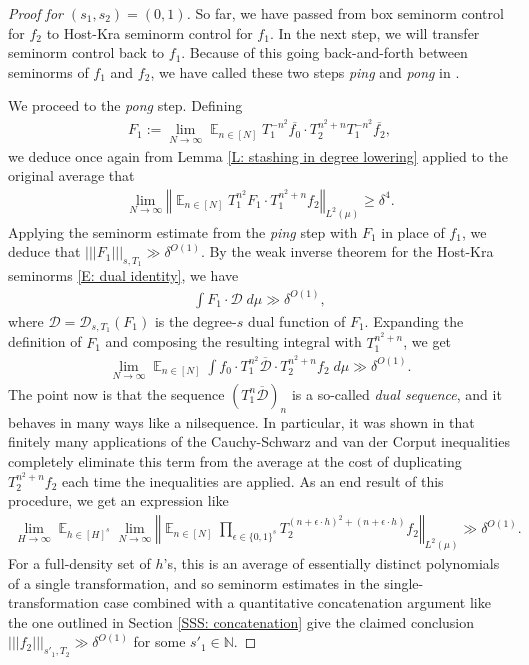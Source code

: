 \documentclass[11pt]{amsart}
\theoremstyle{definition}
\DeclareMathOperator*{\E}{\mathbb{E}}
\newcommand{\N}{{\mathbb N}}
\newcommand{\CD}{{\mathcal D}}
\newcommand{\eps}{\epsilon}
\newcommand{\norm}[1]{\left\Vert #1\right\Vert}
\newcommand{\nnorm}[1]{\lvert\!|\!| #1|\!|\!\rvert}
\newcommand{\1}{{\mathbf{1}}}
\begin{document}
\begin{proof}[Proof for $(s_1, s_2) = (0,1)$]
    So far, we have passed from box seminorm control for $f_2$ to Host-Kra seminorm control for $f_1$. In the next step, we will transfer seminorm control back to $f_1$. Because of this going back-and-forth between seminorms of $f_1$ and $f_2$, we have called these two steps \emph{ping} and \emph{pong} in \cite{FrKu22a}.

    We proceed to the \emph{pong} step. Defining
        \begin{align*}
        F_1 :=\lim_{N\to\infty}\E_{n\in[N]}T_1^{-n^2}\overline{f_0}\cdot T_2^{n^2+n}T_1^{-n^2}\overline{f_2},
    \end{align*}
    we deduce once again from Lemma \ref{L: stashing in degree lowering} applied to the original average that 
       \begin{align*}
        \lim_{N\to\infty}\norm{\E_{n\in[N]}T_1^{n^2}F_1\cdot T_1^{n^2+n}f_2}_{L^2(\mu)} \geq\delta^4.
    \end{align*} 
    Applying the seminorm estimate from the \emph{ping} step with $F_1$ in place of $f_1$, we deduce that $\nnorm{F_1}_{s,T_1}\gg\delta^{O(1)}$. By the weak inverse theorem for the Host-Kra seminorms \eqref{E: dual identity}, we have
    \begin{align*}
        \int F_1 \cdot \CD\; d\mu \gg \delta^{O(1)},
    \end{align*}
    where $\CD = \CD_{s,T_1}(F_1)$ is the degree-$s$ dual function of $F_1$. Expanding the definition of $F_1$ and composing the resulting integral with $T_1^{n^2 + n}$, we get
    \begin{align*}
                \lim_{N\to\infty}\E_{n\in[N]}\int f_0 \cdot T_1^{n^2}\overline{\CD}\cdot T_2^{n^2+n}f_2\; d\mu \gg \delta^{O(1)}.
    \end{align*}
    The point now is that the sequence $(T_1^n \overline{\CD})_n$ is a so-called \emph{dual sequence}, and it behaves in many ways like a nilsequence. In particular, it was shown in \cite[Proposition 6.1]{Fr12} that finitely many applications of the Cauchy-Schwarz and van der Corput inequalities completely eliminate this term from the average at the cost of duplicating $T_2^{n^2+n}f_2$ each time the inequalities are applied. As an end result of this procedure, we get an expression like
    \begin{align*}
        \lim_{H\to\infty}\E_{h\in[H]^s}\lim_{N\to\infty}\norm{\E_{n\in[N]}\prod_{\eps\in\{0,1\}^s}T_2^{(n+\eps\cdot h)^2+(n+\eps\cdot h)}f_2}_{L^2(\mu)}\gg \delta^{O(1)}.
    \end{align*}
    For a full-density set of $h$'s, this is an average of essentially distinct polynomials of a single transformation, and so seminorm estimates in the single-transformation case combined with a quantitative concatenation argument like the one outlined in Section \ref{SSS: concatenation} give the claimed conclusion $\nnorm{f_2}_{s'_1,T_2}\gg\delta^{O(1)}$ for some $s'_1\in\N$.
\end{proof}
\end{document}
